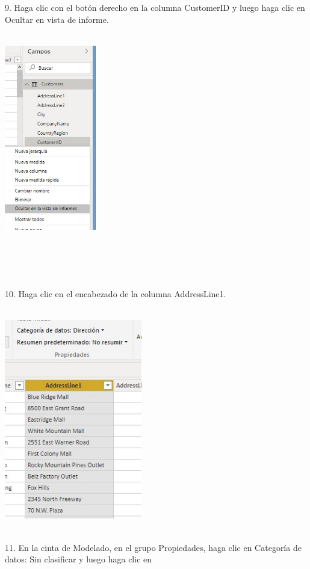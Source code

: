 \documentclass[12pt,letterpaper]{article}
\begin{document}
\begin{flushleft}
\begin{itemize}
9. Haga clic con el botón derecho en la columna CustomerID y luego haga clic en Ocultar en vista de informe.\\
\textbf{ }\\
\begin{center}
	\includegraphics[width=4cm]{./Imagenes/image11} 
	\end{center}
\textbf{ }\\
\textbf{ }\\
\textbf{ }\\
\textbf{ }\\
10. Haga clic en el encabezado de la columna AddressLine1.\\
\textbf{ }\\
\begin{center}
	\includegraphics[width=6cm]{./Imagenes/image12} 
	\end{center}
\textbf{ }\\
11. En la cinta de Modelado, en el grupo Propiedades, haga clic en Categoría de datos: Sin clasificar y luego haga clic en

\end{itemize}
\end{flushleft}
\end{document}

